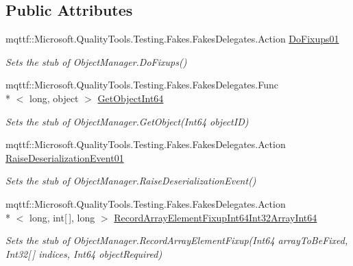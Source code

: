 \subsection*{Public Attributes}
\begin{DoxyCompactItemize}
\item 
mqttf\-::\-Microsoft.\-Quality\-Tools.\-Testing.\-Fakes.\-Fakes\-Delegates.\-Action \hyperlink{class_system_1_1_runtime_1_1_serialization_1_1_fakes_1_1_stub_object_manager_a47c853d955a2eb4592aacec61bf90064}{Do\-Fixups01}
\begin{DoxyCompactList}\small\item\em Sets the stub of Object\-Manager.\-Do\-Fixups()\end{DoxyCompactList}\item 
mqttf\-::\-Microsoft.\-Quality\-Tools.\-Testing.\-Fakes.\-Fakes\-Delegates.\-Func\\*
$<$ long, object $>$ \hyperlink{class_system_1_1_runtime_1_1_serialization_1_1_fakes_1_1_stub_object_manager_a046a335f86d00d01ff31346a55a0ac49}{Get\-Object\-Int64}
\begin{DoxyCompactList}\small\item\em Sets the stub of Object\-Manager.\-Get\-Object(\-Int64 object\-I\-D)\end{DoxyCompactList}\item 
mqttf\-::\-Microsoft.\-Quality\-Tools.\-Testing.\-Fakes.\-Fakes\-Delegates.\-Action \hyperlink{class_system_1_1_runtime_1_1_serialization_1_1_fakes_1_1_stub_object_manager_ae65e1dbc2f7fa3e8be3589edf8d73da9}{Raise\-Deserialization\-Event01}
\begin{DoxyCompactList}\small\item\em Sets the stub of Object\-Manager.\-Raise\-Deserialization\-Event()\end{DoxyCompactList}\item 
mqttf\-::\-Microsoft.\-Quality\-Tools.\-Testing.\-Fakes.\-Fakes\-Delegates.\-Action\\*
$<$ long, int\mbox{[}$\,$\mbox{]}, long $>$ \hyperlink{class_system_1_1_runtime_1_1_serialization_1_1_fakes_1_1_stub_object_manager_ae65163788810b3c1855442217dab0b78}{Record\-Array\-Element\-Fixup\-Int64\-Int32\-Array\-Int64}
\begin{DoxyCompactList}\small\item\em Sets the stub of Object\-Manager.\-Record\-Array\-Element\-Fixup(\-Int64 array\-To\-Be\-Fixed, Int32\mbox{[}$\,$\mbox{]} indices, Int64 object\-Required)\end{DoxyCompactList}\item 

\end{DoxyCompactItemize}
